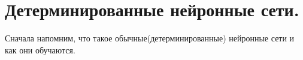 \documentclass{article}
\begin{document}
\section{Детерминированные нейронные сети.}

Сначала напомним, что такое обычные(детерминированные) нейронные сети и как они обучаются.
\end{document}
